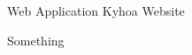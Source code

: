 \cventry
{Web Application} %
{Kyhoa Website} %
{\href{https://github.com/giathuan123/mynn}{\faExternalLink*}} %
{\diPythonPlain \diDjangoPlainWordmark \diPostgresqlPlain \diHerokuPlain} %
{
  \begin{cvitems}
  \item {Something}
  \end{cvitems}
}
